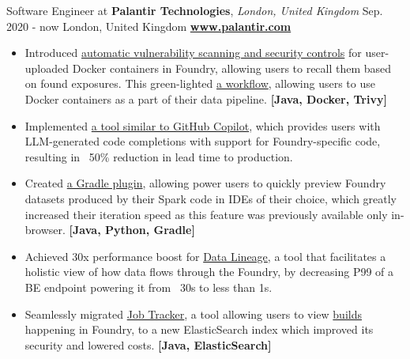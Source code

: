 \cveventflat
{Software Engineer at }
{\textbf{Palantir Technologies}, \textit{London, United Kingdom}}
{Sep. 2020 - now}
{London, United Kingdom}
\newline
\href{https://www.palantir.com/}{\textbf{www.palantir.com}}
\begin{itemize}
    \item {
        Introduced
        \href{https://www.palantir.com/docs/foundry/administration/container-governance/}{automatic vulnerability scanning and security controls}
        for user-uploaded Docker containers in Foundry, allowing users to recall them based on found exposures.
        This green-lighted
        \href{https://www.palantir.com/docs/foundry/transforms-python/container-overview/}{a workflow},
        allowing users to use Docker containers as a part of their data pipeline.
    }
    \newline
    \textbf{[Java, Docker, Trivy]}
    \item {
        Implemented
        \href{https://www.palantir.com/docs/foundry/code-repositories/aip-features/#code-autocomplete}{a tool similar to GitHub Copilot},
        which provides users with LLM-generated code completions with support for Foundry-specific code,
        resulting in ~50\% reduction in lead time to production.
    }
    \item {
        Created
        \href{https://www.palantir.com/docs/foundry/transforms-common/local-preview/}{a Gradle plugin},
        allowing power users to quickly preview Foundry datasets produced by their Spark code in IDEs of their
        choice, which greatly increased their iteration speed as this feature was previously available only in-browser.
    }
    \textbf{[Java, Python, Gradle]}
    \item {
        Achieved 30x performance boost for
        \href{https://www.palantir.com/docs/foundry/data-lineage/overview/}{Data Lineage},
        a tool that facilitates a holistic view of how data flows through the Foundry,
        by decreasing P99 of a BE endpoint powering it from ~30s to less than 1s.
    }
    \item {
        Seamlessly migrated
        \href{https://www.palantir.com/docs/foundry/data-integration/application-reference/#builds}{Job Tracker},
        a tool allowing users to view
        \href{https://www.palantir.com/docs/foundry/data-integration/builds/}{builds}
        happening in Foundry, to a new ElasticSearch index which improved its security and lowered costs.
    }
    \textbf{[Java, ElasticSearch]}

\end{itemize}
